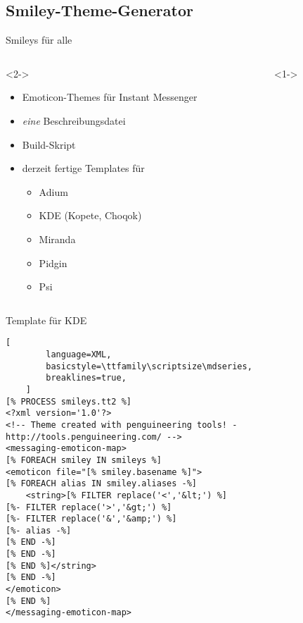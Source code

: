 \documentclass[hyperref={pdfpagelabels=false}]{beamer}
\begin{document}
\subsection{Smiley-Theme-Generator}

\begin{frame}{Smileys für alle}
    \begin{columns}
        \begin{column}{0.4\textwidth}<2->
            \begin{itemize}
                \item Emoticon-Themes für Instant Messenger
                \item \emph{eine} Beschreibungsdatei
                \item Build-Skript
                \item derzeit fertige Templates für
                    \begin{itemize}
                        \item Adium
                        \item KDE (Kopete, Choqok)
                        \item Miranda
                        \item Pidgin
                        \item Psi
                    \end{itemize}
            \end{itemize}
        \end{column}
        \begin{column}{0.6\textwidth}<1->
            \begin{centering}
            \end{centering}
        \end{column}
    \end{columns}
\end{frame}

\begin{frame}[fragile]{Template für KDE}
    \begin{lstlisting}[
        language=XML,
        basicstyle=\ttfamily\scriptsize\mdseries,
        breaklines=true,
    ]
[% PROCESS smileys.tt2 %]
<?xml version='1.0'?>
<!-- Theme created with penguineering tools! - http://tools.penguineering.com/ -->
<messaging-emoticon-map>
[% FOREACH smiley IN smileys %]
<emoticon file="[% smiley.basename %]">
[% FOREACH alias IN smiley.aliases -%]
    <string>[% FILTER replace('<','&lt;') %]
[%- FILTER replace('>','&gt;') %]
[%- FILTER replace('&','&amp;') %]
[%- alias -%]
[% END -%]
[% END -%]
[% END %]</string>
[% END -%]
</emoticon>
[% END %]
</messaging-emoticon-map>
    \end{lstlisting}
\end{frame}
\end{document}
